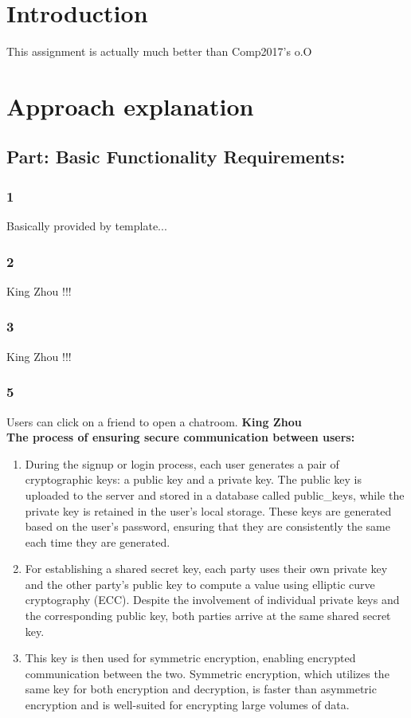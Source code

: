 \documentclass[12pt]{article}
\begin{document}
\section{Introduction}

This assignment is actually much better than Comp2017's o.O

\section{Approach explanation}
    \subsection*{Part: Basic Functionality Requirements:}
        \subsubsection*{1} Basically provided by template...

        \subsubsection*{2} King Zhou !!!

        \subsubsection*{3} King Zhou !!!

        \subsubsection*{5} 

        Users can click on a friend to open a chatroom. \textbf{King Zhou}\\

        \textbf{The process of ensuring secure communication between users:}
        \begin{enumerate}
            \item During the signup or login process, each user generates a pair of cryptographic keys: a public key and a private key. The public key is uploaded to the server and stored in a database called public\_keys, while the private key is retained in the user's local storage. These keys are generated based on the user's password, ensuring that they are consistently the same each time they are generated.
            \item For establishing a shared secret key, each party uses their own private key and the other party's public key to compute a value using elliptic curve cryptography (ECC). Despite the involvement of individual private keys and the corresponding public key, both parties arrive at the same shared secret key.
            \item This key is then used for symmetric encryption, enabling encrypted communication between the two. Symmetric encryption, which utilizes the same key for both encryption and decryption, is faster than asymmetric encryption and is well-suited for encrypting large volumes of data.
        \end{enumerate}
\end{document}
